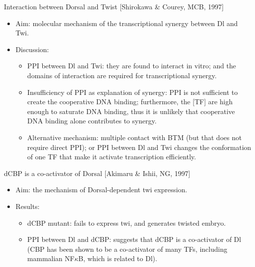 \documentclass{report}
\begin{document}
Interaction between Dorsal and Twist [Shirokawa \& Courey, MCB, 1997]
\begin{itemize}
	\item Aim: molecular mechanism of the transcriptional synergy between Dl and Twi. 
	
	\item Discussion: 
	\begin{itemize}
		\item PPI between Dl and Twi: they are found to interact in vitro; and the domains of interaction are required for transcriptional synergy. 
		\item Insufficiency of PPI as explanation of synergy: PPI is not sufficient to create the cooperative DNA binding; furthermore, the [TF] are high enough to saturate DNA binding, thus it is unlikely that cooperative DNA binding alone contributes to synergy. 
		\item Alternative mechanism: multiple contact with BTM (but that does not require direct PPI); or PPI between Dl and Twi changes the conformation of one TF that make it activate transcription efficiently. 
	\end{itemize}
\end{itemize}

dCBP is a co-activator of Dorsal [Akimaru \& Ishii, NG, 1997]
\begin{itemize}
	\item Aim: the mechanism of Dorsal-dependent twi expression. 
	
	\item Results:
	\begin{itemize}
		\item dCBP mutant: fails to express twi, and generates twisted embryo. 
		\item PPI between Dl and dCBP: suggests that dCBP is a co-activator of Dl (CBP has been shown to be a co-activator of many TFs, including mammalian NF$\kappa$B, which is related to Dl).  
	\end{itemize}
\end{itemize}
\end{document}
